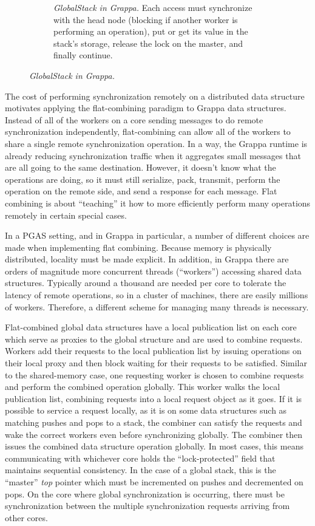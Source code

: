 \begin{figure}[t]
\begin{subfigure}[b]{0.43\textwidth}
    \caption{\emph{GlobalStack in Grappa.} Each access must synchronize with the head node (blocking if another worker is performing an operation), put or get its value in the stack's storage, release the lock on the master, and finally continue.}
    \label{fig:stackfc}
  \end{subfigure}
  \caption{\emph{GlobalStack in Grappa.}}
  \label{fig:stack}
\end{figure}

The cost of performing synchronization remotely on a distributed data structure motivates applying the flat-combining paradigm to Grappa data structures. Instead of all of the workers on a core sending messages to do remote synchronization independently, flat-combining can allow all of the workers to share a single remote synchronization operation. In a way, the Grappa runtime is already reducing synchronization traffic when it aggregates small messages that are all going to the same destination. However, it doesn't know what the operations are doing, so it must still serialize, pack, transmit, perform the operation on the remote side, and send a response for each message. Flat combining is about ``teaching'' it how to more efficiently perform many operations remotely in certain special cases.

In a PGAS setting, and in Grappa in particular, a number of different choices are made when implementing flat combining. Because memory is physically distributed, locality must be made explicit. In addition, in Grappa there are orders of magnitude more concurrent threads (``workers'') accessing shared data structures. Typically around a thousand are needed per core to tolerate the latency of remote operations, so in a cluster of machines, there are easily millions of workers. Therefore, a different scheme for managing many threads is necessary.

Flat-combined global data structures have a local publication list on each core which serve as proxies to the global structure and are used to combine requests. Workers add their requests to the local publication list by issuing operations on their local proxy and then block waiting for their requests to be satisfied. Similar to the shared-memory case, one requesting worker is chosen to combine requests and perform the combined operation globally. This worker walks the local publication list, combining requests into a local request object as it goes. If it is possible to service a request locally, as it is on some data structures such as matching pushes and pops to a stack, the combiner can satisfy the requests and wake the correct workers even before synchronizing globally. The combiner then issues the combined data structure operation globally. In most cases, this means communicating with whichever core holds the ``lock-protected'' field that maintains sequential consistency. In the case of a global stack, this is the ``master'' \emph{top} pointer which must be incremented on pushes and decremented on pops. On the core where global synchronization is occurring, there must be synchronization between the multiple synchronization requests arriving from other cores.

